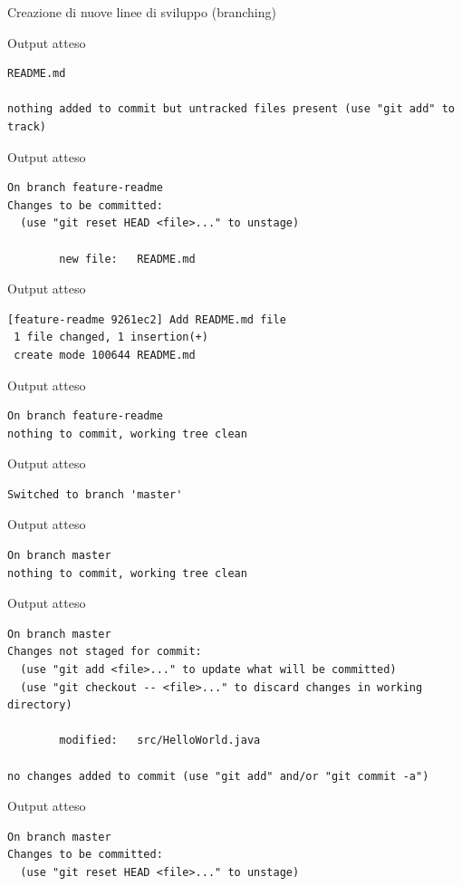 \documentclass[presentation]{beamer}
\begin{document}
\begin{frame}{Creazione di nuove linee di sviluppo (branching)}
\begin{block}{Output atteso}
\begin{Verbatim}[fontsize=\scriptsize]
        README.md

nothing added to commit but untracked files present (use "git add" to track)
		\end{Verbatim}
	\end{block}
	\begin{block}{Output atteso}
		\begin{Verbatim}[fontsize=\scriptsize]
On branch feature-readme
Changes to be committed:
  (use "git reset HEAD <file>..." to unstage)

        new file:   README.md

		\end{Verbatim}
	\end{block}
	\begin{block}{Output atteso}
		\begin{Verbatim}[fontsize=\scriptsize]
[feature-readme 9261ec2] Add README.md file
 1 file changed, 1 insertion(+)
 create mode 100644 README.md
		\end{Verbatim}
	\end{block}
	\begin{block}{Output atteso}
		\begin{Verbatim}[fontsize=\scriptsize]
On branch feature-readme
nothing to commit, working tree clean
		\end{Verbatim}
	\end{block}
	\begin{block}{Output atteso}
		\begin{Verbatim}[fontsize=\scriptsize]
Switched to branch 'master'
		\end{Verbatim}
	\end{block}
	\begin{block}{Output atteso}
		\begin{Verbatim}[fontsize=\scriptsize]
On branch master
nothing to commit, working tree clean
		\end{Verbatim}
	\end{block}
	\begin{block}{Output atteso}
		\begin{Verbatim}[fontsize=\scriptsize]
On branch master
Changes not staged for commit:
  (use "git add <file>..." to update what will be committed)
  (use "git checkout -- <file>..." to discard changes in working directory)

        modified:   src/HelloWorld.java

no changes added to commit (use "git add" and/or "git commit -a")
		\end{Verbatim}
	\end{block}
	\begin{block}{Output atteso}
		\begin{Verbatim}[fontsize=\scriptsize]
On branch master
Changes to be committed:
  (use "git reset HEAD <file>..." to unstage)


\end{Verbatim}
\end{block}
\end{frame}
\end{document}
